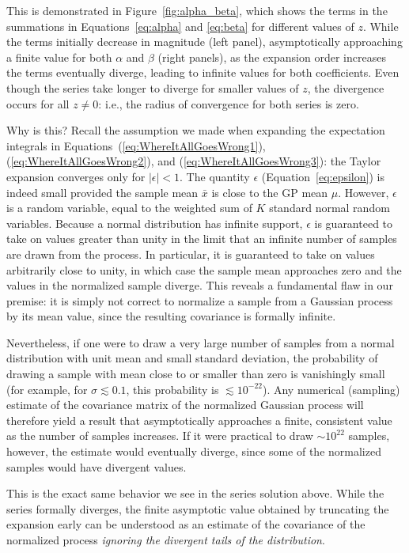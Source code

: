 \documentclass[modern]{aastex62}
\begin{document}
%
This is demonstrated in Figure~\ref{fig:alpha_beta}, which shows the
terms in the summations in Equations~\ref{eq:alpha} and \ref{eq:beta} for
different values of $z$. While the terms initially decrease in magnitude
(left panel), asymptotically approaching a finite value for both
$\alpha$ and $\beta$ (right panels), as the expansion order increases
the terms eventually diverge, leading to infinite values for both
coefficients. Even though the series take longer to diverge for smaller
values of $z$, the divergence occurs for all $z \ne 0$: i.e., the radius
of convergence for both series is zero.

Why is this? Recall the assumption we made when expanding the expectation
integrals in Equations~(\ref{eq:WhereItAllGoesWrong1}), (\ref{eq:WhereItAllGoesWrong2}),
and (\ref{eq:WhereItAllGoesWrong3}): the Taylor expansion converges only for
$\big|\epsilon| < 1$. The quantity $\epsilon$ (Equation~\ref{eq:epsilon})
is indeed small provided the sample mean $\bar{x}$ is close to the GP
mean $\mu$. However, $\epsilon$ is a random variable, equal to
the weighted sum of $K$ standard normal random variables. Because a normal
distribution has infinite support, $\epsilon$ is guaranteed to take on
values greater than unity in the limit that an infinite number of samples
are drawn from the process. In particular, it is guaranteed to take on values
arbitrarily close to unity, in which case the sample mean approaches zero and
the values in the normalized sample diverge.
This reveals a fundamental flaw in our premise:
it is simply not correct to normalize a sample from a Gaussian process by its
mean value, since the resulting covariance is formally infinite.

Nevertheless, if one were to draw a very large number of samples from a normal
distribution with unit mean and small standard deviation,
the probability of drawing a sample with mean close to or smaller than zero
is vanishingly small (for example, for $\sigma \lesssim 0.1$, this probability
is $\lesssim 10^{-22}$).
Any numerical (sampling) estimate of the
covariance matrix of the normalized Gaussian process will therefore yield
a result that asymptotically approaches a finite, consistent value as the
number of samples increases. If it were practical to draw
$\sim 10^{22}$ samples, however, the estimate would eventually diverge, since
some of the normalized samples would have divergent values.

This is the exact same behavior we see in the series solution above.
While the series formally diverges, the finite asymptotic value obtained
by truncating the expansion early can be understood as an estimate of
the covariance of the normalized process \emph{ignoring the divergent
tails of the distribution}.
\end{document}
